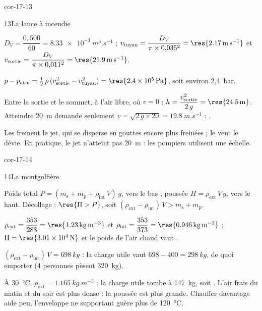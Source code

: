 \begin{blocLivre}{cor-17-13}
\begin{corrige}{13}{La lance à incendie}
\begin{questions}
\item $D_V=\dfrac{0{,}500}{60}=\qty{8,33e-3}{m^3.s^{-1}}$ ; $v_\mathrm{tuyau}=\dfrac{D_V}{\pi\times0{,}035^2}=\res{\qty{2,17}{m.s^{-1}}}$ et
$v_\mathrm{sortie}=\dfrac{D_V}{\pi\times0{,}011^2}=\res{\qty{21,9}{m.s^{-1}}}$.
\item $p-p_\mathrm{atm}=\frac12\,\rho\,(v_\mathrm{sortie}^2-v_\mathrm{tuyau}^2)=\res{\qty{2,4e5}{Pa}}$, soit environ 2,4~bar.
\item Entre la sortie et le sommet, à l'air libre, où $v=0$ : $h=\dfrac{v_\mathrm{sortie}^2}{2\,g}=\res{\qty{24,5}{m}}$. Atteindre
\qty{20}{m} demande seulement $v=\sqrt{2\,g\times20}=\qty{19,8}{m.s^{-1}}$ : .
\item Les  freinent le jet, qui se disperse en gouttes encore plus freinées ; le vent le
dévie. En pratique, le jet n'atteint pas \qty{20}{m} : les pompiers utilisent une échelle.
\end{questions}
\end{corrige}
\end{blocLivre}
\begin{blocLivre}{cor-17-14}
\begin{corrige}{14}{La montgolfière}
\begin{questions}
\item Poids total $P=(m_\mathrm{s}+m_\mathrm{p}+\rho_\mathrm{int}\,V)\,g$, vers le bas ; poussée $\Pi=\rho_\mathrm{ext}\,V\,g$, vers le haut.
Décollage : $\res{\Pi>P}$, soit $(\rho_\mathrm{ext}-\rho_\mathrm{int})\,V>m_\mathrm{s}+m_\mathrm{p}$.
\item $\rho_\mathrm{ext}=\dfrac{353}{288}=\res{\qty{1,23}{kg.m^{-3}}}$ et $\rho_\mathrm{int}=\dfrac{353}{373}=\res{\qty{0,946}{kg.m^{-3}}}$ ;
$\Pi=\res{\qty{3,01e4}{N}}$ et le poids de l'air chaud vaut .
\item $(\rho_\mathrm{ext}-\rho_\mathrm{int})\,V=\qty{698}{kg}$ : la charge utile vaut $698-400=\qty{298}{kg}$, de quoi emporter
 (4 personnes pèsent \qty{320}{kg}).
\item À \qty{30}{\degreeCelsius}, $\rho_\mathrm{ext}=\qty{1,165}{kg.m^{-3}}$ : la charge utile tombe à \qty{147}{kg}, soit
. L'air frais du matin et du soir est plus dense : la poussée est plus grande. Chauffer
davantage aide peu, l'enveloppe ne supportant guère plus de \qty{120}{\degreeCelsius}.
\end{questions}
\end{corrige}
\end{blocLivre}
